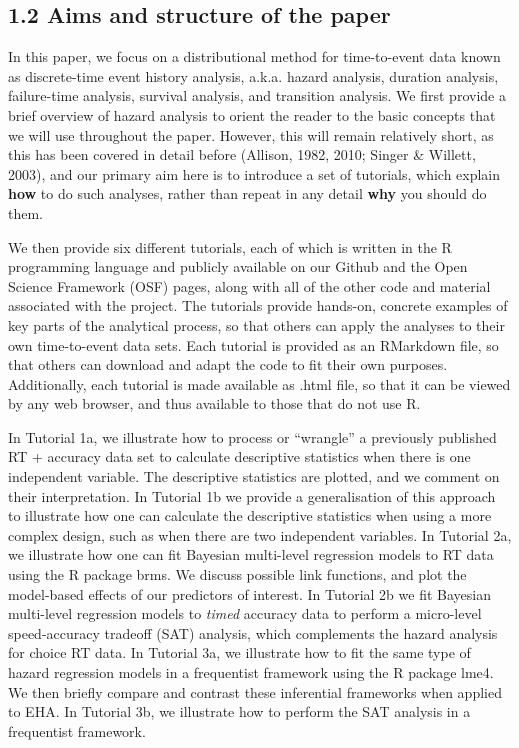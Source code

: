 \documentclass[
  man,floatsintext]{apa6}
\begin{document}
\subsection{1.2 Aims and structure of the paper}\label{aims-and-structure-of-the-paper}

In this paper, we focus on a distributional method for time-to-event data known as discrete-time event history analysis, a.k.a. hazard analysis, duration analysis, failure-time analysis, survival analysis, and transition analysis.
We first provide a brief overview of hazard analysis to orient the reader to the basic concepts that we will use throughout the paper. However, this will remain relatively short, as this has been covered in detail before (Allison, 1982, 2010; Singer \& Willett, 2003), and our primary aim here is to introduce a set of tutorials, which explain \textbf{how} to do such analyses, rather than repeat in any detail \textbf{why} you should do them.

We then provide six different tutorials, each of which is written in the R programming language and publicly available on our Github and the Open Science Framework (OSF) pages, along with all of the other code and material associated with the project. The tutorials provide hands-on, concrete examples of key parts of the analytical process, so that others can apply the analyses to their own time-to-event data sets. Each tutorial is provided as an RMarkdown file, so that others can download and adapt the code to fit their own purposes. Additionally, each tutorial is made available as .html file, so that it can be viewed by any web browser, and thus available to those that do not use R.

In Tutorial 1a, we illustrate how to process or ``wrangle'' a previously published RT + accuracy data set to calculate descriptive statistics when there is one independent variable. The descriptive statistics are plotted, and we comment on their interpretation. In Tutorial 1b we provide a generalisation of this approach to illustrate how one can calculate the descriptive statistics when using a more complex design, such as when there are two independent variables. In Tutorial 2a, we illustrate how one can fit Bayesian multi-level regression models to RT data using the R package brms. We discuss possible link functions, and plot the model-based effects of our predictors of interest. In Tutorial 2b we fit Bayesian multi-level regression models to \emph{timed} accuracy data to perform a micro-level speed-accuracy tradeoff (SAT) analysis, which complements the hazard analysis for choice RT data. In Tutorial 3a, we illustrate how to fit the same type of hazard regression models in a frequentist framework using the R package lme4. We then briefly compare and contrast these inferential frameworks when applied to EHA. In Tutorial 3b, we illustrate how to perform the SAT analysis in a frequentist framework.
\end{document}
